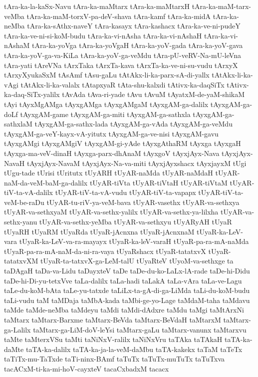 {tAra-ka-la-kaSx-Navu
tAra-ka-maMtarx
tAra-ka-maMtarxH
tAra-ka-maM-tarx-veMba
tAra-ka-maM-torxV-pa-deV-shava
tAra-kamf
tAra-ka-midA
tAra-ka-neMba
tAra-ka-sAthx-naveY
tAra-kasayx
tAra-kashacx
tAra-ka-ve-ni-pudeY
tAra-ka-ve-ni-si-koM-budu
tAra-ka-vi-nAsha
tAra-ka-vi-nAshaH
tAra-ka-vi-nAshaM
tAra-ka-yoVga
tAra-ka-yoVgaH
tAra-ka-yoV-gada
tAra-ka-yoV-gava
tAra-ka-yoV-ga-va-KiLa
tAra-ka-yoV-ga-veMdu
tAra-pU-veRV-Na-mU-leVna
tAra-yati
tAreVNa
tArxTaka
tArxTa-kava
tArxTa-ka-ve-ni-su-vudu
tArxyX
tArxyXyukaSxM
tAsAmf
tAsu-gaLu
tAtAkx-li-ka-parx-sA-di-yallx
tAtAkx-li-ka-vAgi
tAtAkx-li-ka-valalx
tAtapxyaR
tAta-shu-kalxdi
tAtivx-ka-daqSiTx
tAtivx-ka-daq-SiTx-yalilx
tAvAda
tAva-ri-yade
tAvu
tAvuM
tAyatxM-de-yaM-shikaM
tAyi
tAyxMgAMga
tAyxgAMga
tAyxgAMgaM
tAyxgAM-ga-dalilx
tAyxgAM-ga-doLf
tAyxgAM-game
tAyxgAM-ga-miti
tAyxgAM-ga-sathxla
tAyxgAM-ga-sathxlaM
tAyxgAM-ga-sathx-lada
tAyxgAM-ga-vAda
tAyxgAM-ga-veMdu
tAyxgAM-ga-veY-kayx-vA-yitutx
tAyxgAM-ga-ve-nisi
tAyxgAM-gavu
tAyxgAMgi
tAyxgAMgiV
tAyxgAM-gi-yAde
tAyxgAthaRM
tAyxga
tAyxgaH
tAyxga-ma-veV-dinaH
tAyxga-parx-dhAnaM
tAyxgoV
tAyxjAyx-Nava
tAyxjAyx-NavaH
tAyxjAyx-NavaM
tAyxjAyx-Na-va-miti
tAyxjAyxshacx
tAyxjayxM
tUgi
tUgu-tade
tUrisi
tUritutx
tUyARH
tUyAR-naMda
tUyAR-naMdaH
tUyAR-naM-da-veM-baM-ga-dalilx
tUyAR-tiVta
tUyAR-tiVtaH
tUyAR-tiVtaM
tUyAR-tiV-ta-vA-dalilx
tUyAR-tiV-ta-vA-vudu
tUyAR-tiV-ta-vapapx
tUyAR-tiV-ta-veM-be-raDu
tUyAR-tu-riV-ya-veM-bava
tUyAR-vasethx
tUyAR-va-sethxya
tUyAR-va-sethxyaM
tUyAR-va-sethx-yalilx
tUyAR-va-sethx-ya-lilxha
tUyAR-va-sethx-yanu
tUyAR-va-sethx-yeMba
tUyAR-va-sethxyu
tUyARyAH
tUyaR
tUyaRH
tUyaRM
tUyaRda
tUyaR-jAcnxna
tUyaR-jAcnxnaM
tUyaR-ka-LeV-vara
tUyaR-ka-LeV-va-ra-mayayx
tUyaR-ka-leV-varaH
tUyaR-pa-ra-mA-naMda
tUyaR-pa-ra-mA-naM-da-ni-ra-vaya
tUyaRshacx
tUyaR-tatatxvX
tUyaR-tatatxvXM
tUyaR-ta-tatxvX-ga-LeM-talU
tUyaRteV
tUyoM-va-sethxge
ta
taDAgaH
taDa-va-Lidu
taDayxteV
taDe
taDe-du-ko-LaLx-lA-rade
taDe-hi-Didu
taDe-hi-Di-yu-tetxVve
taLa-dalilx
taLa-hadi
taLakA
taLa-vAra
taLa-ve-Lagu
taLe-du-koM-bAta
taLe-yu-tatxde
taLiLx-ta-gA-di-ga-LiMda
taLi-du-koM-budu
taLi-vudu
taM
taMDaja
taMbA-kada
taMbi-ge-yo-Lage
taMdaM-taha
taMdavu
taMde
taMde-neMba
taMdeyu
taMdi
taMdi-dAdxre
taMdu
taMgi
taMtArxNi
taMtarx
taMtarx-Barxme
taMtarx-BeVda
taMtarx-BeVdaH
taMtarxM
taMtarx-ga-Lalilx
taMtarx-ga-LiM-doV-leYsi
taMtarx-gaLu
taMtarx-vanunx
taMtarxvu
taMte
taMterxVSu
taMti
taNiNxV-ralilx
taNiNxVru
taTAka
taTAkaH
taTA-ka-daMte
taTA-ka-dalilx
taTA-ka-ja-la-veM-daMbu
taTA-kakekx
taTaM
taTeTx
taTiTx-mu-TaTxde
taTi-ninx-BAmf
taTuTx
taTuTx-muTuTx
taTuTxva
tacACxM-ti-ka-mi-hoV-cayxteV
tacaCxbadxM
tacacx
}
